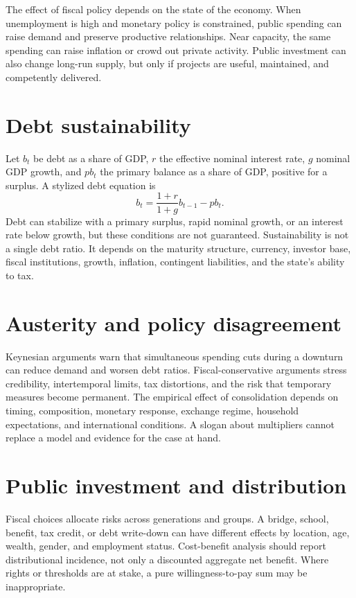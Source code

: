 \documentclass[11pt,oneside,openany]{book}
\begin{document}
The effect of fiscal policy depends on the state of the economy. When unemployment is high and monetary policy is constrained, public spending can raise demand and preserve productive relationships. Near capacity, the same spending can raise inflation or crowd out private activity. Public investment can also change long-run supply, but only if projects are useful, maintained, and competently delivered.

\section{Debt sustainability}

Let $b_t$ be debt as a share of GDP, $r$ the effective nominal interest rate, $g$ nominal GDP growth, and $pb_t$ the primary balance as a share of GDP, positive for a surplus. A stylized debt equation is
\[
  b_t=\frac{1+r}{1+g}b_{t-1}-pb_t.
\]
Debt can stabilize with a primary surplus, rapid nominal growth, or an interest rate below growth, but these conditions are not guaranteed. Sustainability is not a single debt ratio. It depends on the maturity structure, currency, investor base, fiscal institutions, growth, inflation, contingent liabilities, and the state's ability to tax.

\section{Austerity and policy disagreement}

Keynesian arguments warn that simultaneous spending cuts during a downturn can reduce demand and worsen debt ratios. Fiscal-conservative arguments stress credibility, intertemporal limits, tax distortions, and the risk that temporary measures become permanent. The empirical effect of consolidation depends on timing, composition, monetary response, exchange regime, household expectations, and international conditions. A slogan about multipliers cannot replace a model and evidence for the case at hand.

\section{Public investment and distribution}

Fiscal choices allocate risks across generations and groups. A bridge, school, benefit, tax credit, or debt write-down can have different effects by location, age, wealth, gender, and employment status. Cost-benefit analysis should report distributional incidence, not only a discounted aggregate net benefit. Where rights or thresholds are at stake, a pure willingness-to-pay sum may be inappropriate.
\end{document}
